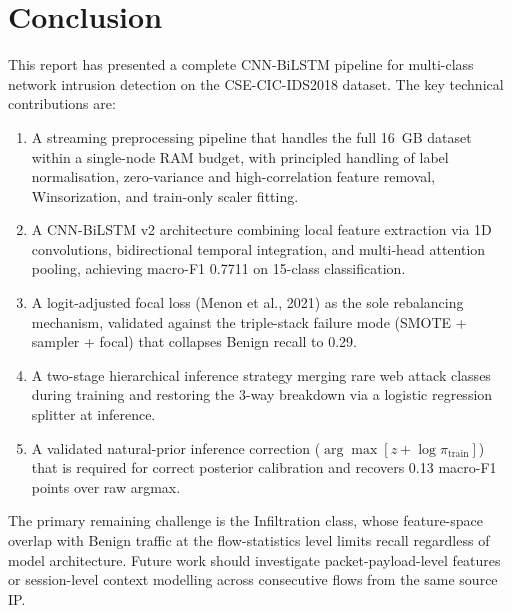 \documentclass[12pt]{article}
\theoremstyle{plain}
\begin{document}
\newpage

\section{Conclusion}
\label{sec:conclusion}

This report has presented a complete CNN-BiLSTM pipeline for multi-class network intrusion detection on the CSE-CIC-IDS2018 dataset. The key technical contributions are:

\begin{enumerate}
    \item A streaming preprocessing pipeline that handles the full 16~GB dataset within a single-node RAM budget, with principled handling of label normalisation, zero-variance and high-correlation feature removal, Winsorization, and train-only scaler fitting.
    \item A CNN-BiLSTM v2 architecture combining local feature extraction via 1D convolutions, bidirectional temporal integration, and multi-head attention pooling, achieving macro-F1 0.7711 on 15-class classification.
    \item A logit-adjusted focal loss (Menon et al., 2021) as the sole rebalancing mechanism, validated against the triple-stack failure mode (SMOTE + sampler + focal) that collapses Benign recall to 0.29.
    \item A two-stage hierarchical inference strategy merging rare web attack classes during training and restoring the 3-way breakdown via a logistic regression splitter at inference.
    \item A validated natural-prior inference correction ($\arg\max[z + \log\pi_{\text{train}}]$) that is required for correct posterior calibration and recovers 0.13 macro-F1 points over raw argmax.
\end{enumerate}

The primary remaining challenge is the Infiltration class, whose feature-space overlap with Benign traffic at the flow-statistics level limits recall regardless of model architecture. Future work should investigate packet-payload-level features or session-level context modelling across consecutive flows from the same source IP.
\end{document}
